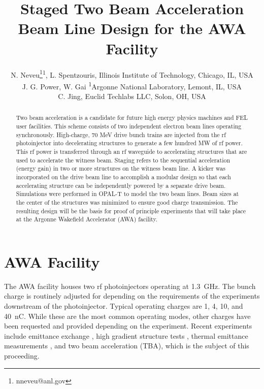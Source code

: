 \documentclass[letterpaper,  %
              ]{jacow-2_3}   %
\begin{document}
\title{Staged Two Beam Acceleration Beam Line Design for the AWA Facility}

\author{N. Neveu\thanks{nneveu@anl.gov}\textsuperscript{1}, 
	    L. Spentzouris, Illinois Institute of Technology, Chicago, IL, USA \\
	    J. G. Power, W. Gai \textsuperscript{1}Argonne National Laboratory, Lemont, IL, USA \\
	    C. Jing, Euclid Techlabs LLC, Solon, OH, USA}
\maketitle

%
\begin{abstract}
Two beam acceleration is a candidate for future high energy physics machines and FEL user facilities. 
This scheme consists of two independent electron beam lines operating synchronously. 
High-charge, 70 MeV drive bunch trains are injected from the rf photoinjector into
decelerating structures to generate a few hundred MW of rf power. 
This rf power is transferred through an rf waveguide to accelerating structures that are used to
accelerate the witness beam. Staging refers to the sequential acceleration (energy gain) 
in two or more structures on the witness beam line. A kicker was incorporated on the 
drive beam line to accomplish a modular design so that each accelerating structure 
can be independently powered by a separate drive beam. 
Simulations were performed in OPAL-T to model the two beam lines. 
Beam sizes at the center of the structures was minimized to ensure good charge transmission. 
The resulting design will be the basis for proof of principle experiments that will take place 
at the Argonne Wakefield Accelerator (AWA) facility.
\end{abstract}


\section{AWA Facility}
The AWA facility houses two rf photoinjectors
operating at \SI{1.3}{GHz}. 
The bunch charge is routinely adjusted for depending on the requirements 
of the experiments downstream of the photoinjector.
Typical operating charges are 1, 4, 10, and \SI{40}{nC}. 
While these are the most
common operating modes, other charges have been requested 
and provided depending on the experiment.
Recent experiments include emittance exchange \cite{eex}, 
high gradient structure tests \cite{pets}, thermal emittance measurements \cite{therm}, 
and two beam acceleration \cite{tba} (TBA), which is the subject of this proceeding. 
\end{document}
